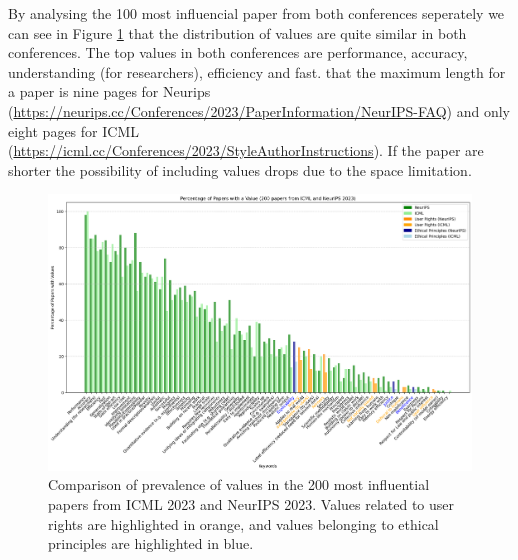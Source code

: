 \documentclass{article}
\begin{document}
By analysing the 100 most influencial paper from both conferences seperately we can see in Figure \ref{fig:percentage_comparison_conferences}
that the distribution of values are quite similar in both conferences. The top values in both conferences are performance, accuracy, understanding (for researchers), efficiency and fast.
that the maximum length for a paper is nine pages for Neurips (\url{https://neurips.cc/Conferences/2023/PaperInformation/NeurIPS-FAQ}) and only eight pages for ICML (\url{https://icml.cc/Conferences/2023/StyleAuthorInstructions}). If the paper
are shorter the possibility of including values drops due to the space limitation. 
\begin{figure}[H]
    \centering
    \includegraphics[width=\textwidth]{../plots/percentage_comparison_conferences.png}
    \caption{Comparison of prevalence of values in the 200 most influential papers from ICML 2023 and NeurIPS 2023. Values related to user rights are highlighted in orange, and values belonging to ethical principles are highlighted in blue.}
    \label{fig:percentage_comparison_conferences}
\end{figure}
\end{document}

